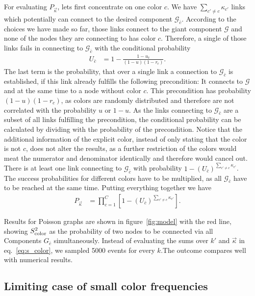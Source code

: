 \documentclass[aps, pre, onecolumn, a4paper, floatfix]{revtex4}
\begin{document}
For evaluating $P_{\vec \kappa}$, lets first concentrate on one color $c$. We have 
$\sum_{c'\neq c}\kappa_{c'}$ links which potentially can connect to the desired component ${\mathcal G}_{\bar c}$. 
According to the choices we have made so far, those links connect to the giant component 
${\mathcal G}$ and none of the nodes they are connecting to has color $c$. Therefore, a single 
of those links fails in connecting to ${\mathcal G}_{\bar c}$ with the conditional probability 
\begin{align}
U_{\bar c} &= 1 - \frac{1-u_{\bar c}}{(1-u)(1-r_c)}.\label{eq:U_c}
\end{align}
The last term is the probability, that over a single link a connection to ${\mathcal G}_{\bar c}$
is established, if this link already fulfills the following precondition: 
It connects to ${\mathcal G}$ and at the same time to a node without color $c$. 
This precondition has probability $(1-u)(1-r_c)$, as colors are randomly distributed and therefore 
are not correlated with the probability $u$ or $1-u$. As the links connecting to ${\mathcal G}_{\bar c}$ 
are a subset of all links fulfilling the precondition, the conditional probability can be 
calculated by dividing with the probability of the precondition. 
Notice that the additional information of the explicit color, instead of only stating that the color 
is not $c$, does not alter the results, as a further restriction of the colors 
would meat the numerator and denominator identically and therefore would cancel out. 
There is at least one link connecting to ${\mathcal G}_{\bar c}$ with probability 
$1-(U_{\bar c})^{\sum_{c'\neq c} \kappa_{c'} }$. The success probabilities for different colors have to be 
multiplied, as all ${\mathcal G}_{\bar c}$ have to be reached at the same time. 
Putting everything together we have 
%
\begin{align}
P_{\vec \kappa} &= \prod_{c=1}^C [1-(U_{\bar c})^{\sum_{c'\neq c} \kappa_{c'} }].\label{eq:p_success}
\end{align}

Results for Poisson graphs are shown in figure~\ref{fig:model} with the red line, showing 
$S_{\rm color}^2$ as the probability of two nodes to be connected via all Components 
$G_{\bar c}$ simultaneously. Instead of evaluating the sums over $k'$ and $\vec \kappa$ 
in eq.~\ref{eq:s_color}, we sampled 5000 events for every $k$.The outcome compares well with 
numerical results. 

\subsection{Limiting case of small color frequencies}
\end{document}
